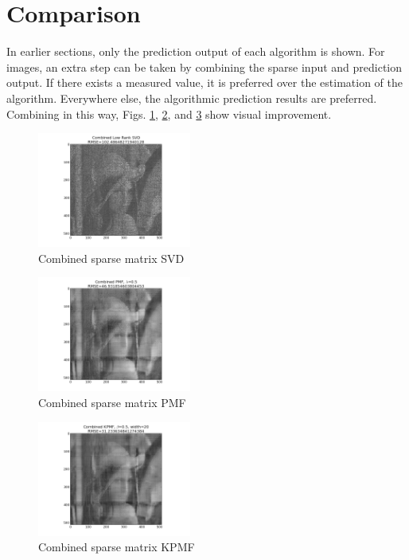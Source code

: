 \documentclass[journal]{IEEEtran}
\begin{document}
\section{Comparison}
In earlier sections, only the prediction output of each algorithm is shown. For images, an extra step can be taken by combining the sparse input and 
prediction output. If there exists a measured value, it is preferred over the estimation of the algorithm. Everywhere else, the algorithmic prediction
results are preferred. Combining in this way, Figs. \ref{fig:combinedsparsesvd}, \ref{fig:combinedpmf}, and \ref{fig:combinedkpmf} show
visual improvement.
\begin{figure}[h!]
\centering
    \includegraphics[width=0.45\textwidth]{combinedsparsesvd.png}
    \caption{Combined sparse matrix SVD}
    \label{fig:combinedsparsesvd}
\end{figure}
\begin{figure}[h!]
\centering
    \includegraphics[width=0.45\textwidth]{combinedpmf.png}
    \caption{Combined sparse matrix PMF}
    \label{fig:combinedpmf}
\end{figure}
\begin{figure}[h!]
\centering
    \includegraphics[width=0.45\textwidth]{combinedkpmf.png}
    \caption{Combined sparse matrix KPMF}
    \label{fig:combinedkpmf}
\end{figure}
\end{document}
